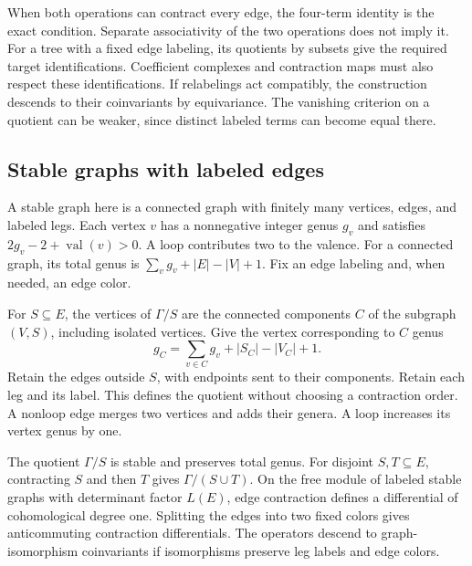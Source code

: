 When both operations can contract every edge, the four-term identity is the exact condition.
Separate associativity of the two operations does not imply it.
For a tree with a fixed edge labeling, its quotients by subsets give the required target identifications.
Coefficient complexes and contraction maps must also respect these identifications.
If relabelings act compatibly, the construction descends to their coinvariants by equivariance.
The vanishing criterion on a quotient can be weaker, since distinct labeled terms can become equal there.

\subsection{Stable graphs with labeled edges}
\label{subsec:stable-graph-contractions}

A stable graph here is a connected graph with finitely many vertices, edges, and labeled legs.
Each vertex $v$ has a nonnegative integer genus $g_v$ and satisfies
$2g_v-2+\operatorname{val}(v)>0$.
A loop contributes two to the valence.
For a connected graph, its total genus is $\sum_v g_v+|E|-|V|+1$.
Fix an edge labeling and, when needed, an edge color.

For $S\subseteq E$, the vertices of $\Gamma/S$ are the connected components
$C$ of the subgraph $(V,S)$, including isolated vertices.
Give the vertex corresponding to $C$ genus
\begin{equation}
\label{eq:simultaneous-graph-genus}
g_C=\sum_{v\in C}g_v+|S_C|-|V_C|+1.
\end{equation}
Retain the edges outside $S$, with endpoints sent to their components.
Retain each leg and its label.
This defines the quotient without choosing a contraction order.
A nonloop edge merges two vertices and adds their genera.
A loop increases its vertex genus by one.

\begin{proposition}
\label{prop:stable-graph-signs}
The quotient $\Gamma/S$ is stable and preserves total genus.
For disjoint $S,T\subseteq E$, contracting $S$ and then $T$ gives $\Gamma/(S\cup T)$.
On the free module of labeled stable graphs with determinant factor $L(E)$,
edge contraction defines a differential of cohomological degree one.
Splitting the edges into two fixed colors gives anticommuting contraction differentials.
The operators descend to graph-isomorphism coinvariants if isomorphisms preserve leg labels and edge colors.
\end{proposition}

